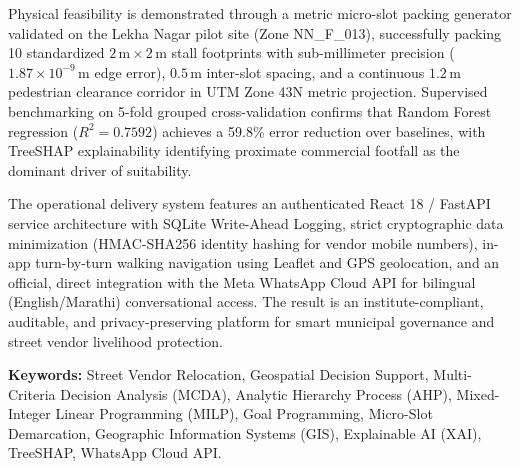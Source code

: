 Physical feasibility is demonstrated through a metric micro-slot packing generator validated on the Lekha Nagar pilot site (Zone NN\_F\_013), successfully packing 10 standardized $2\,\text{m} \times 2\,\text{m}$ stall footprints with sub-millimeter precision ($1.87 \times 10^{-9}\,\text{m}$ edge error), $0.5\,\text{m}$ inter-slot spacing, and a continuous $1.2\,\text{m}$ pedestrian clearance corridor in UTM Zone 43N metric projection. Supervised benchmarking on 5-fold grouped cross-validation confirms that Random Forest regression ($R^2 = 0.7592$) achieves a 59.8\% error reduction over baselines, with TreeSHAP explainability identifying proximate commercial footfall as the dominant driver of suitability.

The operational delivery system features an authenticated React 18 / FastAPI service architecture with SQLite Write-Ahead Logging, strict cryptographic data minimization (HMAC-SHA256 identity hashing for vendor mobile numbers), in-app turn-by-turn walking navigation using Leaflet and GPS geolocation, and an official, direct integration with the Meta WhatsApp Cloud API for bilingual (English/Marathi) conversational access. The result is an institute-compliant, auditable, and privacy-preserving platform for smart municipal governance and street vendor livelihood protection.

\vspace{0.8cm}
\noindent \textbf{Keywords:} Street Vendor Relocation, Geospatial Decision Support, Multi-Criteria Decision Analysis (MCDA), Analytic Hierarchy Process (AHP), Mixed-Integer Linear Programming (MILP), Goal Programming, Micro-Slot Demarcation, Geographic Information Systems (GIS), Explainable AI (XAI), TreeSHAP, WhatsApp Cloud API.
